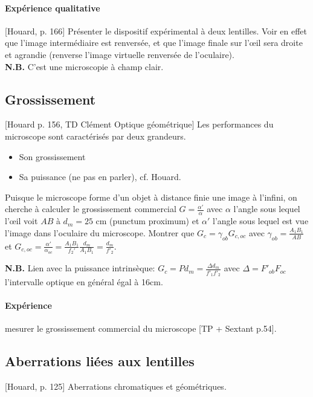 \documentclass[11pt]{report}
\numberwithin{figure}{section}
\numberwithin{equation}{section}
\numberwithin{table}{section}
\newcommand{\1}{\boldsymbol{1}}
\begin{document}
\paragraph{Expérience qualitative} 
[Houard, p. 166] Présenter le dispositif expérimental à deux lentilles. Voir en effet que l'image intermédiaire est renversée, et que l'image finale sur l'œil sera droite et agrandie (renverse l'image virtuelle renversée de l'oculaire). \\

\textbf{N.B.} C'est une microscopie à champ clair.

\subsection{Grossissement}

[Houard p. 156, TD Clément Optique géométrique]
Les performances du microscope sont caractérisés par deux grandeurs.
\begin{itemize}
\item Son grossissement
\item Sa puissance (ne pas en parler), cf. Houard.
\end{itemize}
Puisque le microscope forme d’un objet à distance finie une image à l’infini, on
cherche à calculer le grossissement commercial $G = \frac{\alpha'}{\alpha}$ avec $\alpha$ l’angle sous lequel l'œil voit $AB$ à $d_m = 25$ cm (punctum proximum) et $\alpha'$ l’angle sous lequel est vue l’image dans l’oculaire du microscope. Montrer que $G_c = \gamma_{ob} G_{c,oc}$ avec $\gamma_{ob} = \frac{A_1B_1}{AB}$ et $G_{c,oc} = \frac{\alpha'}{\alpha_{oc}} = \frac{A_1B_1}{f_2'} \frac{d_m}{A_1B_1} = \frac{d_m}{f'_2}$.

\textbf{N.B.} Lien avec la puissance intrinsèque: $G_c = P d_m = \frac{\Delta d_m}{f'_1 f'_2}$ avec $\Delta = F'_{ob} F_{oc}$ l'intervalle optique en général égal à 16cm.

\paragraph{Expérience} mesurer le grossissement commercial du microscope [TP + Sextant p.54].


\subsection{Aberrations liées aux lentilles}

[Houard, p. 125] Aberrations chromatiques et géométriques.
\end{document}
